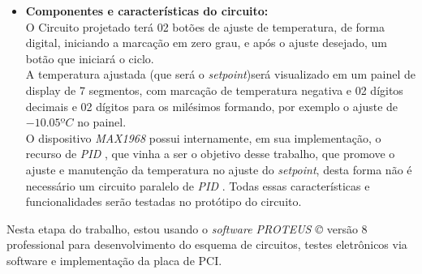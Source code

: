 \begin{itemize}
\item \textbf{Componentes e características do circuito:}\\

O Circuito projetado terá 02 botões de ajuste de temperatura, de forma digital, iniciando a marcação em zero grau, e após o ajuste desejado, um botão que iniciará o ciclo. \\
A temperatura ajustada (que será o \emph{setpoint})será visualizado em um painel de display de 7 segmentos, com marcação de temperatura negativa e 02 dígitos decimais e 02 dígitos para os milésimos formando, por exemplo o ajuste de $ -10.05 ºC $ no painel.\\
O dispositivo \emph{MAX1968} possui internamente, em sua implementação, o recurso de\emph{ PID }, que vinha a ser o objetivo desse trabalho, que promove o ajuste e manutenção da temperatura no ajuste do \emph{setpoint}, desta forma não é necessário um circuito paralelo de \emph{PID }. Todas essas características e funcionalidades serão testadas no protótipo do circuito. \\


\end{itemize}

Nesta etapa do trabalho, estou usando o \emph{software PROTEUS \copyright  } versão 8 professional  para desenvolvimento do esquema de circuitos, testes eletrônicos via software e implementação da placa de PCI. \\

 